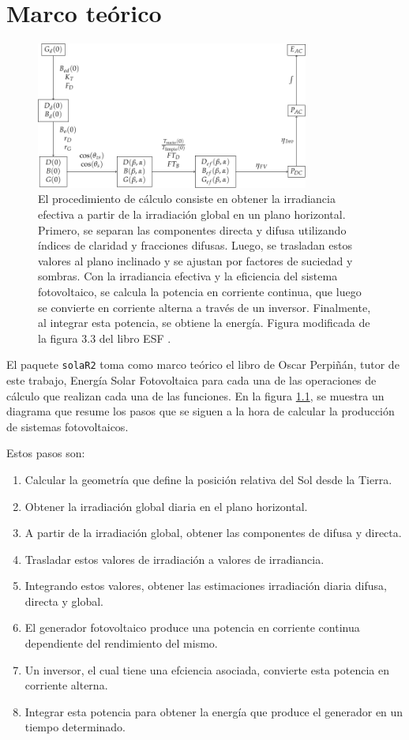 \chapter{Marco teórico}
\label{chap:marco-teorico}
\begin{figure}[H]
\centering
\includegraphics[width=0.8\textwidth]{figuras/ProcedimientoCalculoRadiacionInclinada.pdf}
\caption{\label{fig:org5ecae2f}El procedimiento de cálculo consiste en obtener la irradiancia efectiva a partir de la irradiación global en un plano horizontal. Primero, se separan las componentes directa y difusa utilizando índices de claridad y fracciones difusas. Luego, se trasladan estos valores al plano inclinado y se ajustan por factores de suciedad y sombras. Con la irradiancia efectiva y la eficiencia del sistema fotovoltaico, se calcula la potencia en corriente continua, que luego se convierte en corriente alterna a través de un inversor. Finalmente, al integrar esta potencia, se obtiene la energía. Figura modificada de la figura 3.3 del libro ESF \cite{Perpinan2023}.}
\end{figure}


El paquete \texttt{solaR2} toma como marco teórico el libro de Oscar Perpiñán, tutor de este trabajo, Energía Solar Fotovoltaica \cite{Perpinan2023} para cada una de las operaciones de cálculo que realizan cada una de las funciones.
En la figura \ref{fig:org5ecae2f}, se muestra un diagrama que resume los pasos que se siguen a la hora de calcular la producción de sistemas fotovoltaicos.

Estos pasos son:
\begin{enumerate}
\item Calcular la geometría que define la posición relativa del Sol desde la Tierra.
\item Obtener la irradiación global diaria en el plano horizontal.
\item A partir de la irradiación global, obtener las componentes de difusa y directa.
\item Trasladar estos valores de irradiación a valores de irradiancia.
\item Integrando estos valores, obtener las estimaciones irradiación diaria difusa, directa y global.
\item El generador fotovoltaico produce una potencia en corriente continua dependiente del rendimiento del mismo.
\item Un inversor, el cual tiene una efciencia asociada, convierte esta potencia en corriente alterna.
\item Integrar esta potencia para obtener la energía que produce el generador en un tiempo determinado.
\end{enumerate}


